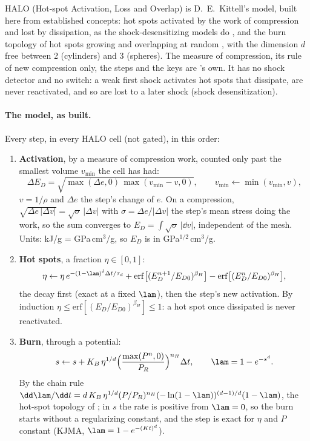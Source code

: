 HALO (Hot-spot Activation, Loss and Overlap) is D.~E.~Kittell's model, built
here from established concepts: hot spots activated by the work of
compression and lost by dissipation, as the shock-desensitizing models do
\cite{menikoff2010}, and the burn topology of hot spots growing and
overlapping at random \cite{hill2009}, with the dimension $d$ free between 2
(cylinders) and 3 (spheres). The measure of compression, its rule of new
compression only, the steps and the keys are \bw's own. It has no shock
detector and no switch: a weak first shock activates hot spots that
dissipate, are never reactivated, and so are lost to a later shock (shock
desensitization).

\paragraph{The model, as built.} Every step, in every HALO cell (not
gated), in this order:
\begin{enumerate}
\item \textbf{Activation}, by a measure of compression work, counted only
  past the smallest volume $v_{\min}$ the cell has had:
  \begin{equation}
    \Delta E_D = \sqrt{\max(\Delta e, 0)\,\max(v_{\min} - v, 0)},
    \qquad v_{\min} \leftarrow \min(v_{\min}, v),
    \label{eq:halo-ed}
  \end{equation}
  $v = 1/\rho$ and $\Delta e$ the step's change of $e$. On a compression,
  $\sqrt{\Delta e\,|\Delta v|} = \sqrt{\sigma}\,|\Delta v|$ with $\sigma =
  \Delta e/|\Delta v|$ the step's mean stress doing the work, so the sum
  converges to $E_D = \int\sqrt{\sigma}\,|\dd v|$, independent of the mesh.
  Units: kJ/g = GPa\,cm$^3$/g, so $E_D$ is in GPa$^{1/2}$\,cm$^3$/g.
\item \textbf{Hot spots}, a fraction $\eta \in [0, 1]$:
  \begin{equation}
    \eta \leftarrow \eta\,e^{-(1 - \lam)^{\delta}\Delta t/\tau_d}
    + \mathrm{erf}\bigl[(E_D^{n+1}/E_{D0})^{\beta_H}\bigr]
    - \mathrm{erf}\bigl[(E_D^{n}/E_{D0})^{\beta_H}\bigr],
    \label{eq:halo-eta}
  \end{equation}
  the decay first (exact at a fixed $\lam$), then the step's new
  activation. By induction $\eta \le \mathrm{erf}[(E_D/E_{D0})^{\beta_H}]
  \le 1$: a hot spot once dissipated is never reactivated.
\item \textbf{Burn}, through a potential:
  \begin{equation}
    s \leftarrow s + K_B\,\eta^{1/d}
      \Bigl(\frac{\max(P^n, 0)}{P_R}\Bigr)^{n_H}\Delta t,
    \qquad \lam = 1 - e^{-s^{d}}.
    \label{eq:halo-burn}
  \end{equation}
  By the chain rule $\dd\lam/\dd t = d\,K_B\,\eta^{1/d}(P/P_R)^{n_H}
  (-\ln(1 - \lam))^{(d-1)/d}(1 - \lam)$, the hot-spot topology of
  \cite{hill2009}; in $s$ the rate is positive from $\lam = 0$, so the burn
  starts without a regularizing constant, and the step is exact for $\eta$
  and $P$ constant (KJMA, $\lam = 1 - e^{-(Kt)^d}$).
\end{enumerate}

